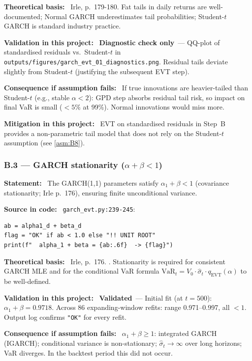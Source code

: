 \documentclass[11pt,a4paper]{article}
\newcommand{\asmfield}[1]{\medskip\noindent\textbf{#1:}\ }
\newcommand{\code}[1]{\texttt{#1}}
\newcommand{\validated}{\textbf{Validated}}
\newcommand{\diagnostic}{\textbf{Diagnostic check only}}
\begin{document}
\asmfield{Theoretical basis}
Irle, p.~179-180. Fat tails in daily returns are well-documented; Normal
GARCH underestimates tail probabilities; Student-$t$ GARCH is standard
industry practice.

\asmfield{Validation in this project}
\diagnostic\ --- QQ-plot of standardised residuals vs.\ Student-$t$ in
\code{outputs/figures/garch\_evt\_01\_diagnostics.png}. Residual tails
deviate slightly from Student-$t$ (justifying the subsequent EVT step).

\asmfield{Consequence if assumption fails}
If true innovations are heavier-tailed than Student-$t$ (e.g., stable
$\alpha < 2$): GPD step absorbs residual tail risk, so impact on final
VaR is small ($< 5\%$ at 99\%). Normal innovations would miss more.

\asmfield{Mitigation in this project}
EVT on standardised residuals in Step~B provides a non-parametric tail
model that does not rely on the Student-$t$ assumption (see \cref{asm:B8}).

\subsubsection{B.3 --- GARCH stationarity ($\alpha + \beta < 1$)}\label{asm:B3}

\asmfield{Statement}
The GARCH(1,1) parameters satisfy $\alpha_1 + \beta < 1$ (covariance
stationarity; Irle p.~176), ensuring finite unconditional variance.

\asmfield{Source in code}
\code{garch\_evt.py:239-245}:
\begin{lstlisting}
ab = alpha1_d + beta_d
flag = "OK" if ab < 1.0 else "!! UNIT ROOT"
print(f"  alpha_1 + beta = {ab:.6f}  -> {flag}")
\end{lstlisting}

\asmfield{Theoretical basis}
Irle, p.~176. \cite{Bollerslev1986}. Stationarity is required for
consistent GARCH MLE and for the conditional VaR formula
$\text{VaR}_t = V_0 \cdot \hat{\sigma}_t \cdot q_{\mathrm{EVT}}(\alpha)$
to be well-defined.

\asmfield{Validation in this project}
\validated\ --- Initial fit (at $t = 500$): $\alpha_1 + \beta = 0.9718$.
Across 86 expanding-window refits: range 0.971--0.997, all $< 1$.
Output log confirms \code{"OK"} for every refit.

\asmfield{Consequence if assumption fails}
$\alpha_1 + \beta \ge 1$: integrated GARCH (IGARCH); conditional variance
is non-stationary; $\hat{\sigma}_t \to \infty$ over long horizons; VaR
diverges. In the backtest period this did not occur.
\end{document}
